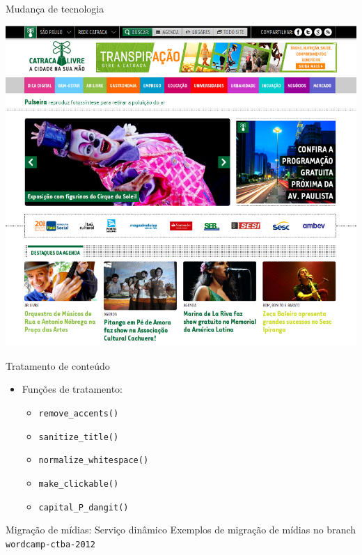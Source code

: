 \documentclass{beamer}
\begin{document}
\begin{frame}{Mudança de tecnologia}
  \begin{center}
    \pause \includegraphics[height=0.8\textheight,natwidth=800,natheight=731]{./img/catracalivre.png}
  \end{center}
\end{frame}

\begin{frame}{Tratamento de conteúdo}
  \begin{itemize}
    \pause \item Funções de tratamento:
    \begin{itemize}
      \pause \item \texttt{remove\_accents()}
      \pause \item \texttt{sanitize\_title()}
      \pause \item \texttt{normalize\_whitespace()}
      \pause \item \texttt{make\_clickable()}
      \pause \item \texttt{capital\_P\_dangit()}
    \end{itemize}
  \end{itemize}
\end{frame}

\begin{frame}{Migração de mídias: Serviço dinâmico}
  \pause Exemplos de migração de mídias no branch \texttt{wordcamp-ctba-2012}
\end{frame}
\end{document}
